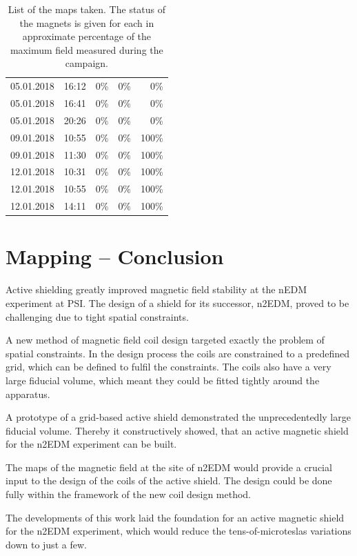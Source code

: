 \begin{table}
\begin{tabular}{ccrrr}
    05.01.2018  &  16:12  &  0\%      &  0\%    &  0\%    \\
    05.01.2018  &  16:41  &  0\%      &  0\%    &  0\%    \\
    05.01.2018  &  20:26  &  0\%      &  0\%    &  0\%    \\
    09.01.2018  &  10:55  &  0\%      &  0\%    &  100\%  \\
    09.01.2018  &  11:30  &  0\%      &  0\%    &  100\%  \\
    12.01.2018  &  10:31  &  0\%      &  0\%    &  100\%  \\
    12.01.2018  &  10:55  &  0\%      &  0\%    &  100\%  \\
    12.01.2018  &  14:11  &  0\%      &  0\%    &  100\%  \\
  \end{tabular}
  \caption{List of the maps taken.
  The status of the magnets is given for each in approximate percentage of the maximum field measured during the campaign.}\label{tab:psi_mapping_maps}
\end{table}




\section*{Mapping -- Conclusion}
Active shielding greatly improved magnetic field stability at the nEDM experiment at PSI\@.
The design of a shield for its successor, n2EDM, proved to be challenging due to tight spatial constraints.

A new method of magnetic field coil design targeted exactly the problem of spatial constraints.
In the design process the coils are constrained to a predefined grid, which can be defined to fulfil the constraints.
The coils also have a very large fiducial volume, which meant they could be fitted tightly around the apparatus.

A prototype of a grid-based active shield demonstrated the unprecedentedly large fiducial volume.
Thereby it constructively showed, that an active magnetic shield for the n2EDM experiment can be built.

The maps of the magnetic field at the site of n2EDM would provide a crucial input to the design of the coils of the active shield.
The design could be done fully within the framework of the new coil design method.

The developments of this work laid the foundation for an active magnetic shield for the n2EDM experiment, which would reduce the tens-of-microteslas variations down to just a few.